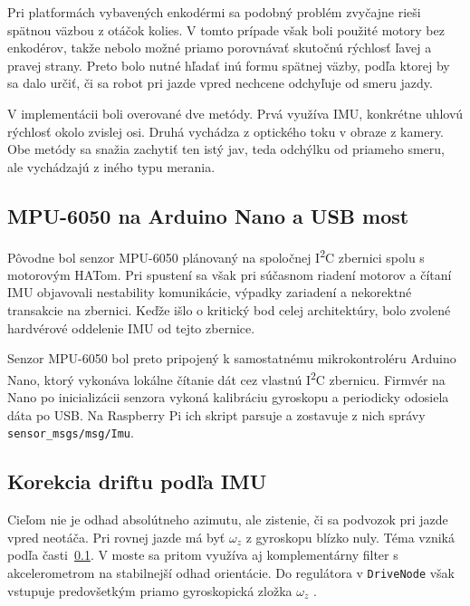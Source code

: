         Pri platformách vybavených enkodérmi sa podobný problém zvyčajne rieši spätnou väzbou z otáčok kolies. V tomto prípade však boli použité motory bez enkodérov, takže nebolo možné priamo porovnávať skutočnú rýchlosť ľavej a pravej strany. Preto bolo nutné hľadať inú formu spätnej väzby, podľa ktorej by sa dalo určiť, či sa robot pri jazde vpred nechcene odchyľuje od smeru jazdy.
      
        V implementácii boli overované dve metódy. Prvá využíva IMU, konkrétne uhlovú rýchlosť okolo zvislej osi. Druhá vychádza z optického toku v obraze z kamery. Obe metódy sa snažia zachytiť ten istý jav, teda odchýlku od priameho smeru, ale vychádzajú z iného typu merania.
      
        \subsection{MPU-6050 na Arduino Nano a USB most}
        \label{sec:mpu6050-nano-usb}
      
        Pôvodne bol senzor MPU-6050 plánovaný na spoločnej I\textsuperscript{2}C zbernici spolu s motorovým HATom. Pri spustení sa však pri súčasnom riadení motorov a čítaní IMU objavovali nestability komunikácie, výpadky zariadení a nekorektné transakcie na zbernici. Keďže išlo o kritický bod celej architektúry, bolo zvolené hardvérové oddelenie IMU od tejto zbernice.
      
        Senzor MPU-6050 bol preto pripojený k samostatnému mikrokontroléru Arduino Nano, ktorý vykonáva lokálne čítanie dát cez vlastnú I\textsuperscript{2}C zbernicu. Firmvér na Nano po inicializácii senzora vykoná kalibráciu gyroskopu a periodicky odosiela dáta po USB. Na Raspberry Pi ich skript  parsuje a zostavuje z nich správy \texttt{sensor\_msgs/msg/Imu}.
      
        \subsection{Korekcia driftu podľa IMU}
      
        Cieľom nie je odhad absolútneho azimutu, ale zistenie, či sa podvozok pri jazde vpred neotáča. Pri rovnej jazde má byť $\omega_z$ z gyroskopu blízko nuly. Téma  vzniká podľa časti~\ref{sec:mpu6050-nano-usb}. V moste sa pritom využíva aj komplementárny filter s akcelerometrom na stabilnejší odhad orientácie. Do regulátora v \texttt{DriveNode} však vstupuje predovšetkým priamo gyroskopická zložka $\omega_z$ .
      
